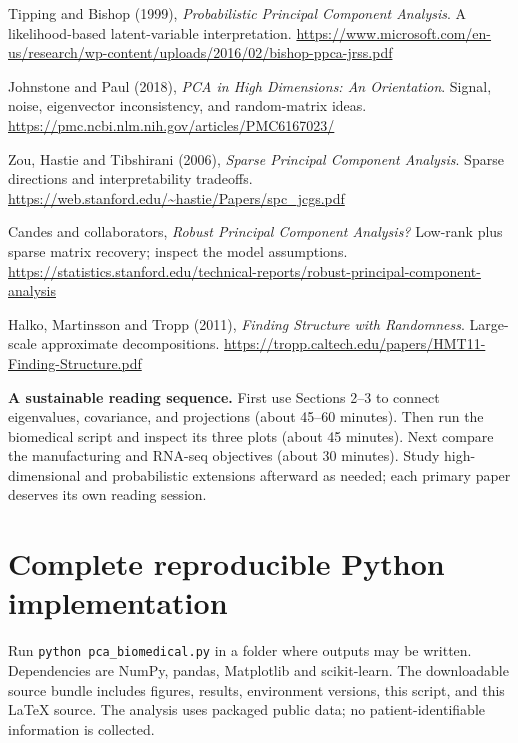\documentclass[11pt]{article}
\begin{document}
\begin{enumerate}[label={[\arabic*]}]
\item\label{ref:ppca} Tipping and Bishop (1999), \emph{Probabilistic Principal Component Analysis}. A likelihood-based latent-variable interpretation. \url{https://www.microsoft.com/en-us/research/wp-content/uploads/2016/02/bishop-ppca-jrss.pdf}
\item\label{ref:highdim} Johnstone and Paul (2018), \emph{PCA in High Dimensions: An Orientation}. Signal, noise, eigenvector inconsistency, and random-matrix ideas. \url{https://pmc.ncbi.nlm.nih.gov/articles/PMC6167023/}
\item Zou, Hastie and Tibshirani (2006), \emph{Sparse Principal Component Analysis}. Sparse directions and interpretability tradeoffs. \url{https://web.stanford.edu/~hastie/Papers/spc_jcgs.pdf}
\item Candes and collaborators, \emph{Robust Principal Component Analysis?} Low-rank plus sparse matrix recovery; inspect the model assumptions. \url{https://statistics.stanford.edu/technical-reports/robust-principal-component-analysis}
\item Halko, Martinsson and Tropp (2011), \emph{Finding Structure with Randomness}. Large-scale approximate decompositions. \url{https://tropp.caltech.edu/papers/HMT11-Finding-Structure.pdf}
\end{enumerate}
\textbf{A sustainable reading sequence.} First use Sections 2--3 to connect eigenvalues, covariance, and projections (about 45--60 minutes). Then run the biomedical script and inspect its three plots (about 45 minutes). Next compare the manufacturing and RNA-seq objectives (about 30 minutes). Study high-dimensional and probabilistic extensions afterward as needed; each primary paper deserves its own reading session.

\appendix\section{Complete reproducible Python implementation}
Run \texttt{python pca\_biomedical.py} in a folder where outputs may be written. Dependencies are NumPy, pandas, Matplotlib and scikit-learn. The downloadable source bundle includes figures, results, environment versions, this script, and this LaTeX source. The analysis uses packaged public data; no patient-identifiable information is collected.

\end{document}
